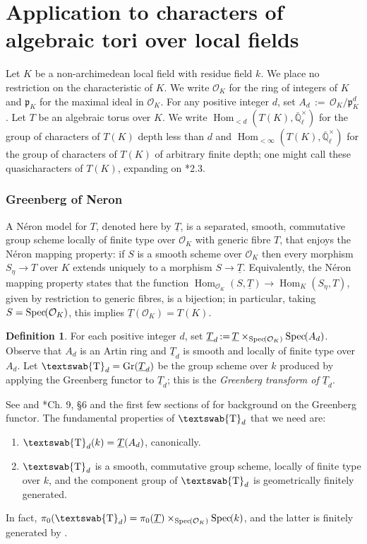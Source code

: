 \documentclass[11pt]{amsart}
\makeatletter
\newcommand{\mathswab}[1]{\operatorname{\textswab{#1}}}
\theoremstyle{plain}
\theoremstyle{definition}
\newtheorem{definition}[theorem]{Definition}
\theoremstyle{remark}
\newcommand{\Spec}[1]{{\operatorname{Spec}\hskip-1pt( #1 )}}
\newcommand{\EE}{\mathbb{\bar Q}_\ell}
\newcommand{\OK}{\mathcal{O}_K}
\newcommand{\pK}{\mathfrak{p}_K}
\newcommand{\Fq}{k}
\newcommand{\EEx}{\EE^\times}
\DeclareMathOperator{\Hom}{Hom}
\DeclareMathOperator{\Gr}{Gr}
\newcommand{\ceq}{{\, :=\, }}
\newcommand{\GN}[1]{\mathswab{#1}}
\newcommand{\TT}{\underline{T}}
\newcommand{\labitem}[2]{%
\def\@itemlabel{\textbf{#1}}
\item
\def\@currentlabel{#1}\label{#2}}
\newcommand\Clifton[1]{\marginpar{\smaller\smaller CC: #1}}
\makeatother
\begin{document}
\part{Application to characters of algebraic tori over local fields}

Let $K$ be a non-archimedean local field with residue field $\Fq$.
We place no restriction on the characteristic of $K$. 
We write $\OK$ for the ring of integers of $K$ and $\pK$ for the maximal ideal in $\OK$. 
For any positive integer $d$, set $A_d\ceq \OK/\pK^d$.
Let $T$ be an algebraic torus over $K$.
We write $\Hom_{< d}(T(K),\EEx)$ for the group of characters of $T(K)$ depth less than $d$ 
and $\Hom_{<\infty}(T(K),\EEx)$ for the group of characters of $T(K)$ of arbitrary finite depth; one might call these quasicharacters of $T(K)$, expanding on \cite{tate:67a}*{2.3}.

\section{Greenberg of Neron}
\label{sec:GN}

A N\'eron model for $T$, denoted here by $\TT$, 
is a separated, smooth, commutative group scheme locally of finite type over $\OK$ with generic fibre $T$, that enjoys the N\'eron mapping property: \Clifton{Include reference to BLR.}
if $S$ is a smooth scheme over $\OK$ then every morphism $S_\eta \to T$
over $K$ extends uniquely to a morphism $S \to \TT$. Equivalently, the
N\'eron mapping property states that the function
$\Hom_{\OK} (S,\TT) \to \Hom_K(S_\eta,T)$, given by restriction to
generic fibres, is a bijection; 
in particular, taking $S = \Spec{\OK}$, this implies $\TT(\OK) = T(K)$.

\begin{definition}\label{def:GN}
For each positive integer $d$, set $\TT_{d} \ceq \TT \times_\Spec{\OK} \Spec{A_d}$. Observe that $A_d$ is an Artin ring and $\TT_{d}$ is smooth and locally of finite type over $A_d$.
%
Let $\GN{T}_{d} = \Gr(\TT_d)$ be the group scheme over $\Fq$ produced by applying
the Greenberg functor to $\TT_{d}$; this is the \emph{Greenberg transform of $\TT_d$}.
\end{definition}

See \cite{greenberg:63a} and \cite{bosch-lutkebohmert-reynaud:NeronModels}*{Ch. 9, \S 6} and the first few sections of \cite{stasinski:12a} for background on the Greenberg functor. The fundamental properties of $\GN{T}_d$ that we need are:
 \begin{enumerate}
   \labitem{(GN.0)}{dFq} $\GN{T}_d(\Fq) = \TT(A_d)$, canonically.
  \labitem{(GN.1)}{GNd} $\GN{T}_d$ is a smooth, commutative group scheme, locally of finite type over $\Fq$, and the component group of $\GN{T}_d$ is geometrically finitely generated.
  \end{enumerate}
In fact, $\pi_0(\GN{T}_d) = \pi_0(\TT) \times_{\Spec{\OK}} \Spec{\Fq}$, and the latter is finitely generated by \cite{xarles:93a}. 
\end{document}
